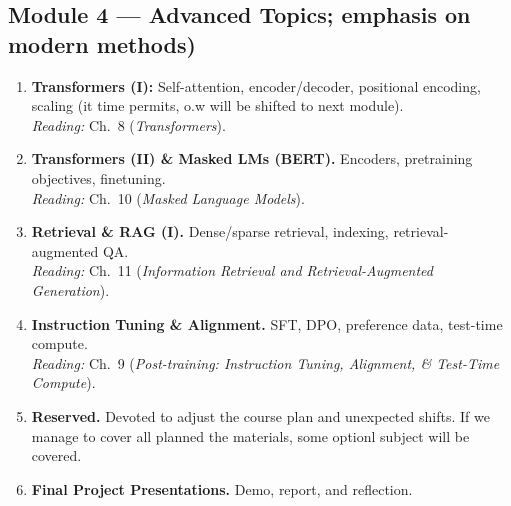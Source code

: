 \documentclass[12pt]{article}
\begin{document}
\subsection*{Module 4 — Advanced Topics; emphasis on modern methods)}
\begin{enumerate}[label=\textbf{Week \arabic*.}, start=8, leftmargin=*]
    \item \textbf{Transformers (I):} Self-attention, encoder/decoder, positional encoding, scaling (it time permits, o.w will be shifted to next module).\\
        \emph{Reading:} Ch.\ 8 (\emph{Transformers}).
        
  \item \textbf{Transformers (II) \& Masked LMs (BERT).} Encoders, pretraining objectives, finetuning.\\
        \emph{Reading:} Ch.\ 10 (\emph{Masked Language Models}).
        
  \item \textbf{Retrieval \& RAG (I).} Dense/sparse retrieval, indexing, retrieval-augmented QA.\\
        \emph{Reading:} Ch.\ 11 (\emph{Information Retrieval and Retrieval-Augmented Generation}).

  \item \textbf{Instruction Tuning \& Alignment.} SFT, DPO, preference data, test-time compute.\\
        \emph{Reading:} Ch.\ 9 (\emph{Post-training: Instruction Tuning, Alignment, \& Test-Time Compute}).
  
  \item \textbf{Reserved.} Devoted to adjust the course plan and unexpected shifts. If we manage to cover all planned the materials, some optionl subject will be covered.   



\item \textbf{Final Project Presentations.} Demo, report, and reflection.

        
\end{enumerate}
\end{document}
